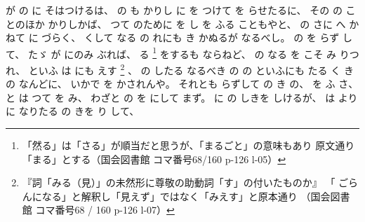 %
が
の
に
そはつけるは、
%
の
も%
かりし
に
を
つけて
を
らせたるに、
%
その
の
ことのほか
かりしかば、
%
つて
のために
を
し
%
を
ふる
こともやと、
%
の
さに
へ
かねて
に
づらく、
%
くして
なる
の%
れにも
%
き
かぬるが
なるべし。
%
の%
を
らず
して、
%
たゞ%
が
にのみ
ぶれば、
%
る
\footnote{「然る」は「さる」が順当だと思うが、「まるごと」の意味もあり
  原文通り「まる」とする（国会図書館 コマ番号68/160 p-126 l-05）}%
をするも
ならねど、
%
の
なる
を
こそ
み
りつれ、
%
といふ
は
にも
えす
\footnote{『詞「みる（見）」の未然形に尊敬の助動詞「す」の付いたものか』
  「 ごらんになる」と解釈し「見えず」ではなく「みえす」と原本通り
  （国会図書館 コマ番号68 / 160 p-126 l-07）}%
、
%
の
したる
なるべき
の
の
といふにも
たる
く
き
の
なんどに、
%
いかで
を%
かされんや。
%
それとも
らずして
の
き
の、
%
を%
ふ
さ、
%
と
は
つて
を
み、
%
わざと
の%
を
にして%
まず。
%
に
の
しきを
しけるが、
%
は
より
に
なりたる
の
きを
り
して、

